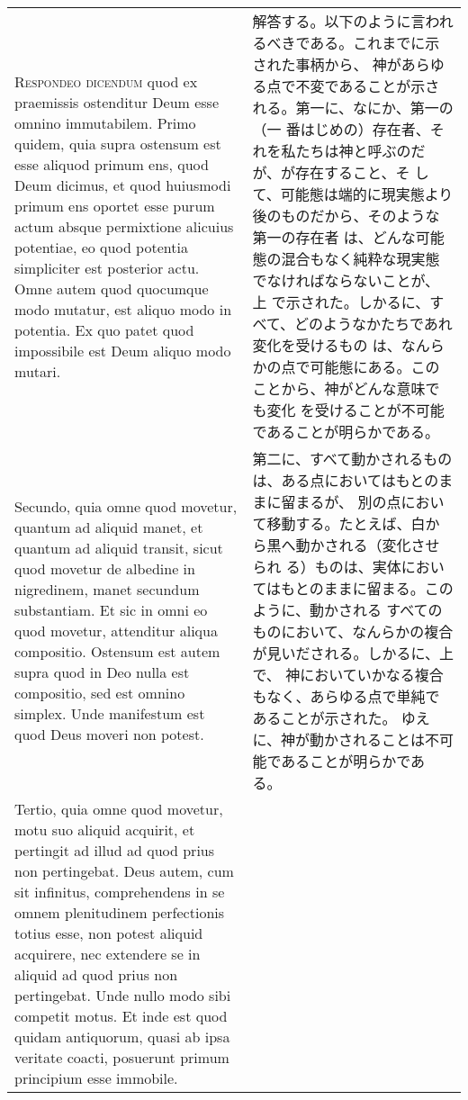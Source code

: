 \documentclass[10pt]{jsarticle} %
\begin{document}
\begin{longtable}{p{21em}p{21em}}
\\


{\scshape Respondeo dicendum} quod ex praemissis ostenditur Deum esse
 omnino immutabilem. Primo quidem, quia supra ostensum est esse
 aliquod primum ens, quod Deum dicimus, et quod huiusmodi primum ens
 oportet esse purum actum absque permixtione alicuius potentiae, eo
 quod potentia simpliciter est posterior actu. Omne autem quod
 quocumque modo mutatur, est aliquo modo in potentia. Ex quo patet
 quod impossibile est Deum aliquo modo mutari.


&

解答する。以下のように言われるべきである。これまでに示された事柄から、
 神があらゆる点で不変であることが示される。第一に、なにか、第一の（一
 番はじめの）存在者、それを私たちは神と呼ぶのだが、が存在すること、そ
 して、可能態は端的に現実態より後のものだから、そのような第一の存在者
 は、どんな可能態の混合もなく純粋な現実態でなければならないことが、上
 で示された。しかるに、すべて、どのようなかたちであれ変化を受けるもの
 は、なんらかの点で可能態にある。このことから、神がどんな意味でも変化
 を受けることが不可能であることが明らかである。

\\


Secundo, quia omne quod movetur, quantum ad aliquid manet, et quantum
 ad aliquid transit, sicut quod movetur de albedine in nigredinem,
 manet secundum substantiam. Et sic in omni eo quod movetur,
 attenditur aliqua compositio. Ostensum est autem supra quod in Deo
 nulla est compositio, sed est omnino simplex. Unde manifestum est
 quod Deus moveri non potest.


&

第二に、すべて動かされるものは、ある点においてはもとのままに留まるが、
 別の点において移動する。たとえば、白から黒へ動かされる（変化させられ
 る）ものは、実体においてはもとのままに留まる。このように、動かされる
 すべてのものにおいて、なんらかの複合が見いだされる。しかるに、上で、
 神においていかなる複合もなく、あらゆる点で単純であることが示された。
 ゆえに、神が動かされることは不可能であることが明らかである。


\\

Tertio, quia omne quod movetur, motu suo aliquid acquirit, et
 pertingit ad illud ad quod prius non pertingebat. Deus autem, cum sit
 infinitus, comprehendens in se omnem plenitudinem perfectionis totius
 esse, non potest aliquid acquirere, nec extendere se in aliquid ad
 quod prius non pertingebat. Unde nullo modo sibi competit motus. Et
 inde est quod quidam antiquorum, quasi ab ipsa veritate coacti,
 posuerunt primum principium esse immobile.



\end{longtable}
\end{document}
